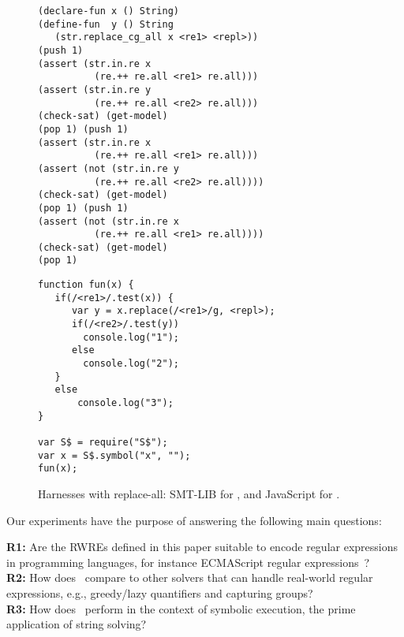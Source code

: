 \begin{figure}[tb]
  \scriptsize

  \begin{minipage}{0.49\linewidth}
\begin{verbatim}
(declare-fun x () String)
(define-fun  y () String
   (str.replace_cg_all x <re1> <repl>))
(push 1)
(assert (str.in.re x 
          (re.++ re.all <re1> re.all)))
(assert (str.in.re y 
          (re.++ re.all <re2> re.all)))
(check-sat) (get-model)
(pop 1) (push 1)
(assert (str.in.re x 
          (re.++ re.all <re1> re.all)))
(assert (not (str.in.re y 
          (re.++ re.all <re2> re.all))))
(check-sat) (get-model)
(pop 1) (push 1)
(assert (not (str.in.re x 
          (re.++ re.all <re1> re.all))))
(check-sat) (get-model)
(pop 1)
\end{verbatim}
  \end{minipage}\hfill
  \raisebox{-25ex}{\rule{0.4pt}{52ex}}\hfill
  \begin{minipage}{0.49\linewidth}
\begin{verbatim}
function fun(x) {
   if(/<re1>/.test(x)) {
      var y = x.replace(/<re1>/g, <repl>);
      if(/<re2>/.test(y))
        console.log("1");
      else
        console.log("2");
   }
   else
       console.log("3");
}

var S$ = require("S$");
var x = S$.symbol("x", "");
fun(x);
\end{verbatim}
  \end{minipage}
  
  \caption{Harnesses with replace-all: SMT-LIB for \ostrich,
    and JavaScript for \expose{}.}
  \label{fig:harness}
  \vspace{-4mm}
\end{figure}

Our experiments have the purpose of answering the following main questions:

\medskip
\noindent
\textbf{R1:} Are the  RWREs defined in this paper
suitable to encode regular expressions in programming languages,
for instance ECMAScript regular expressions~\cite{ECMAScript11}?
\\
\textbf{R2:} How does \ostrich\ compare to other solvers that can
handle real-world regular expressions, e.g., greedy/lazy
quantifiers and capturing groups?
\\
\textbf{R3:} How does \ostrich\ perform in the context of symbolic execution,
the prime application of string solving?

